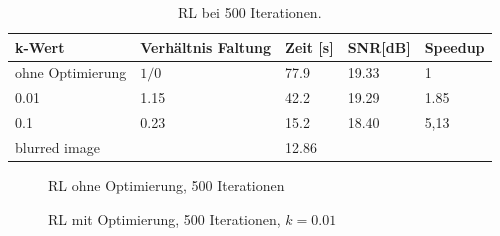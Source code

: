 \documentclass[a4paper,12pt]{article}
\begin{document}
\begin{table}[h]
\begin{center}
\begin{tabular}{ | l | l | l | l | l |}
\hline
k-Wert 				& Verhältnis Faltung	& Zeit [s] 	& SNR[dB] & Speedup \\ \hline
ohne Optimierung 	&		$1/0$				& 	77.9 	& 19.33   & 	1	\\ \hline
0.01				&		1.15				&	42.2 	& 19.29   &  	1.85\\
0.1					&		0.23				&	15.2 	& 18.40   & 	5,13\\ \hline

blurred image	&		  & 12.86 & \\
\hline
\end{tabular}
\caption{RL bei 500 Iterationen.}
\label{tab:konv_time_SNR_RL_500}
\end{center}
\end{table}
 


\begin{figure}[h]
\caption{RL ohne Optimierung, 500 Iterationen}%
\label{figure_konv_ohne}
\end{figure}

\begin{figure}[h]
\caption{RL mit Optimierung, 500 Iterationen, $k = 0.01$}%
\label{figure_konv_k0_01}
\end{figure}
\end{document}
